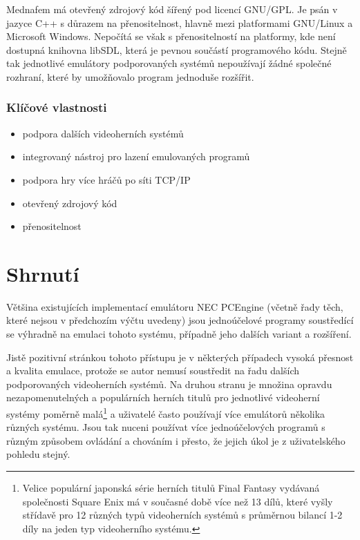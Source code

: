 Mednafem má otevřený zdrojový kód šířený pod licencí GNU/GPL. Je psán v jazyce
C++ s důrazem na přenositelnost, hlavně mezi platformami GNU/Linux a Microsoft
Windows. Nepočítá se však s přenositelností na platformy, kde není dostupná
knihovna libSDL, která je pevnou součástí programového kódu. Stejně tak
jednotlivé emulátory podporovaných systémů nepoužívají žádné společné rozhraní,
které by umožňovalo program jednoduše rozšířit.

\subsubsection*{Klíčové vlastnosti}

\begin{itemize}
\item podpora dalších videoherních systémů
\item integrovaný nástroj pro lazení emulovaných programů
\item podpora hry více hráčů po síti TCP/IP
\item otevřený zdrojový kód
\item přenositelnost
\end{itemize}


\section{Shrnutí}\label{chap:exist_summary}

Většina existujících implementací emulátoru NEC PCEngine (včetně řady těch,
které nejsou v předchozím výčtu uvedeny) jsou jednoúčelové programy soustředící
se výhradně na emulaci tohoto systému, případně jeho dalších variant a
rozšíření.

Jistě pozitivní stránkou tohoto přístupu je v některých případech vysoká
přesnost a kvalita emulace, protože se autor nemusí soustředit na řadu dalších
podporovaných videoherních systémů. Na druhou stranu je množina opravdu
nezapomenutelných a populárních herních titulů pro jednotlivé videoherní
systémy poměrně malá\footnote{Velice populární japonská série herních titulů
Final Fantasy vydávaná společnosti Square Enix má v současné době více než 13
dílů, které vyšly střídavě pro 12 různých typů videoherních systémů s průměrnou
bilancí 1-2 díly na jeden typ videoherního systému.} a uživatelé často
používají více emulátorů několika různých systému. Jsou tak nuceni používat
více jednoúčelových programů s různým způsobem ovládání a chováním i přesto, že
jejich úkol je z uživatelského pohledu stejný.

